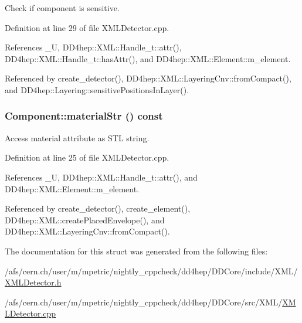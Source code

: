 Check if component is sensitive. 

Definition at line 29 of file XMLDetector.cpp.

References \_\-U, DD4hep::XML::Handle\_\-t::attr(), DD4hep::XML::Handle\_\-t::hasAttr(), and DD4hep::XML::Element::m\_\-element.

Referenced by create\_\-detector(), DD4hep::XML::LayeringCnv::fromCompact(), and DD4hep::Layering::sensitivePositionsInLayer().\hypertarget{struct_d_d4hep_1_1_x_m_l_1_1_component_ae99125c89b1123ad870caf3fd5abe64b}{
\subsubsection[{materialStr}]{ Component::materialStr () const}}
\label{struct_d_d4hep_1_1_x_m_l_1_1_component_ae99125c89b1123ad870caf3fd5abe64b}


Access material attribute as STL string. 

Definition at line 25 of file XMLDetector.cpp.

References \_\-U, DD4hep::XML::Handle\_\-t::attr(), and DD4hep::XML::Element::m\_\-element.

Referenced by create\_\-detector(), create\_\-element(), DD4hep::XML::createPlacedEnvelope(), and DD4hep::XML::LayeringCnv::fromCompact().

The documentation for this struct was generated from the following files:\begin{DoxyCompactItemize}
\item 
/afs/cern.ch/user/m/mpetric/nightly\_\-cppcheck/dd4hep/DDCore/include/XML/\hyperlink{_x_m_l_detector_8h}{XMLDetector.h}\item 
/afs/cern.ch/user/m/mpetric/nightly\_\-cppcheck/dd4hep/DDCore/src/XML/\hyperlink{_x_m_l_detector_8cpp}{XMLDetector.cpp}\end{DoxyCompactItemize}

